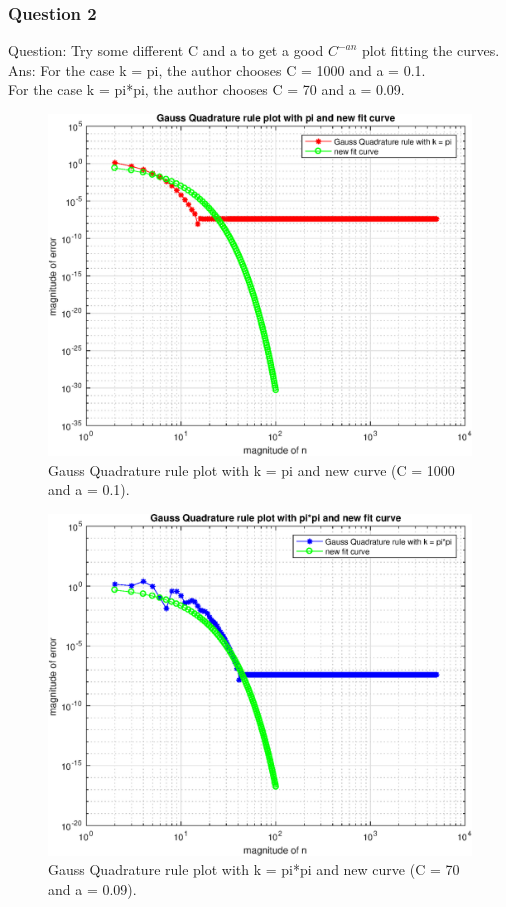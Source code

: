 \documentclass[titlepage]{article}
\begin{document}
\subsubsection{Question 2}
Question: Try some different C and a to get a good $C^{-an}$ plot fitting the
curves.\\
Ans: For the case k = pi, the author chooses C = 1000 and a = 0.1.\\
For the case k = pi*pi, the author chooses C = 70 and a = 0.09.
\begin{figure}[htb]
\begin{center}
\includegraphics[width=1.0\textwidth]{Gauss_fit_1.eps}
\caption{Gauss Quadrature rule plot with k = pi and new curve (C = 1000 and a = 0.1). \label{fig:3}}
\end{center}
\end{figure} 
\begin{figure}[htb]
\begin{center}
\includegraphics[width=1.0\textwidth]{Gauss_fit_2.eps}
\caption{Gauss Quadrature rule plot with k = pi*pi and new curve (C = 70 and a = 0.09). \label{fig:4}}
\end{center}
\end{figure} 
\end{document}

